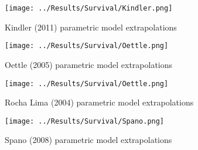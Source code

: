 \begin{figure}[h]
    \centering
    \texttt{[image: ../Results/Survival/Kindler.png]}
    \caption{Kindler (2011) parametric model extrapolations}
    \label{fig:kindlerParamExtrap}
\end{figure}

\begin{figure}[h]
    \centering
    \texttt{[image: ../Results/Survival/Oettle.png]}
    \caption{Oettle (2005) parametric model extrapolations}
    \label{fig:oettleParamExtrap}
\end{figure}

\begin{figure}[h]
    \centering
    \texttt{[image: ../Results/Survival/Oettle.png]}
    \caption{Rocha Lima (2004) parametric model extrapolations}
    \label{fig:rochaLimaParamExtrap}
\end{figure}

\begin{figure}[h]
    \centering
    \texttt{[image: ../Results/Survival/Spano.png]}
    \caption{Spano (2008) parametric model extrapolations}
    \label{fig:spanoParamExtrap}
\end{figure}